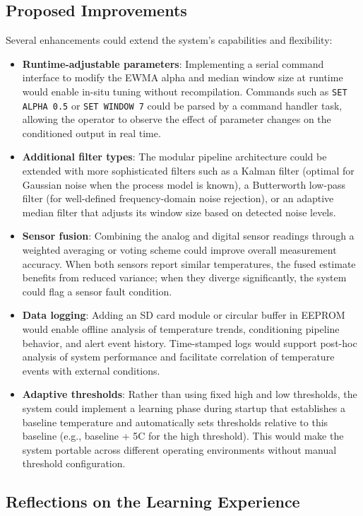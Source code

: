 \subsection{Proposed Improvements}

Several enhancements could extend the system's capabilities and flexibility:
\begin{itemize}
    \item \textbf{Runtime-adjustable parameters}: Implementing a serial command interface to modify the EWMA alpha and median window size at runtime would enable in-situ tuning without recompilation. Commands such as \texttt{SET ALPHA 0.5} or \texttt{SET WINDOW 7} could be parsed by a command handler task, allowing the operator to observe the effect of parameter changes on the conditioned output in real time.
    \item \textbf{Additional filter types}: The modular pipeline architecture could be extended with more sophisticated filters such as a Kalman filter (optimal for Gaussian noise when the process model is known), a Butterworth low-pass filter (for well-defined frequency-domain noise rejection), or an adaptive median filter that adjusts its window size based on detected noise levels.
    \item \textbf{Sensor fusion}: Combining the analog and digital sensor readings through a weighted averaging or voting scheme could improve overall measurement accuracy. When both sensors report similar temperatures, the fused estimate benefits from reduced variance; when they diverge significantly, the system could flag a sensor fault condition.
    \item \textbf{Data logging}: Adding an SD card module or circular buffer in EEPROM would enable offline analysis of temperature trends, conditioning pipeline behavior, and alert event history. Time-stamped logs would support post-hoc analysis of system performance and facilitate correlation of temperature events with external conditions.
    \item \textbf{Adaptive thresholds}: Rather than using fixed high and low thresholds, the system could implement a learning phase during startup that establishes a baseline temperature and automatically sets thresholds relative to this baseline (e.g., baseline + 5\textdegree C for the high threshold). This would make the system portable across different operating environments without manual threshold configuration.
\end{itemize}

\subsection{Reflections on the Learning Experience}

